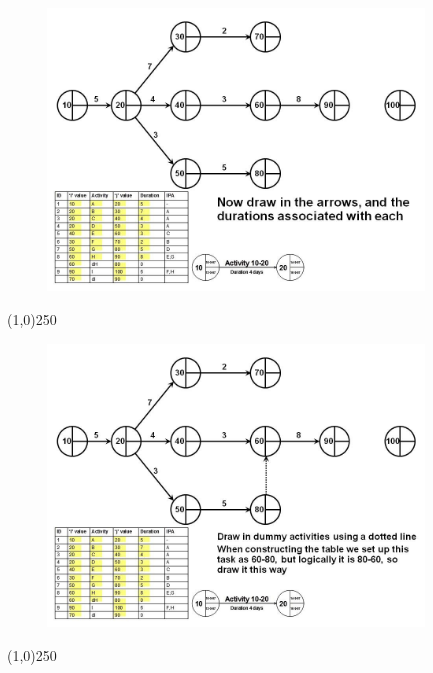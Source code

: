 \begin{frame}
\begin{figure}
	\centering
		\includegraphics[width = 10.0cm]{oldnotes/Slide98.jpg}
\end{figure}
\end{frame}
\begin{center}\line(1,0){250}\end{center}


\begin{frame}
\begin{figure}
	\centering
		\includegraphics[width = 10.0cm]{oldnotes/Slide99.jpg}
\end{figure}
\end{frame}
\begin{center}\line(1,0){250}\end{center}



